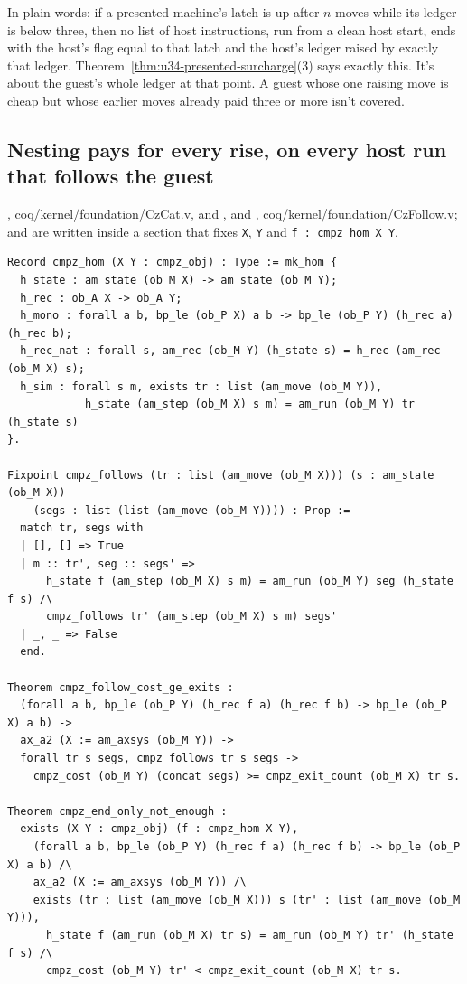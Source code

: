 In plain words: if a presented machine's latch is up after $n$ moves while its ledger is below
three, then no list of host instructions, run from a clean host start, ends with the host's flag
equal to that latch and the host's ledger raised by exactly that ledger.
Theorem~\ref{thm:u34-presented-surcharge}(3) says exactly this. It's about the guest's whole
ledger at that point. A guest whose one raising move is cheap but whose earlier moves already
paid three or more isn't covered.

\subsection{Nesting pays for every rise, on every host run that follows the guest}

{\raggedright {}, coq/kernel/foundation/CzCat.v, and ,
 and ,
coq/kernel/foundation/CzFollow.v;  and 
are written inside a section that fixes \texttt{X}, \texttt{Y} and \texttt{f : cmpz\_hom X Y}.\par}

{\scriptsize
\begin{verbatim}
Record cmpz_hom (X Y : cmpz_obj) : Type := mk_hom {
  h_state : am_state (ob_M X) -> am_state (ob_M Y);
  h_rec : ob_A X -> ob_A Y;
  h_mono : forall a b, bp_le (ob_P X) a b -> bp_le (ob_P Y) (h_rec a) (h_rec b);
  h_rec_nat : forall s, am_rec (ob_M Y) (h_state s) = h_rec (am_rec (ob_M X) s);
  h_sim : forall s m, exists tr : list (am_move (ob_M Y)),
            h_state (am_step (ob_M X) s m) = am_run (ob_M Y) tr (h_state s)
}.

Fixpoint cmpz_follows (tr : list (am_move (ob_M X))) (s : am_state (ob_M X))
    (segs : list (list (am_move (ob_M Y)))) : Prop :=
  match tr, segs with
  | [], [] => True
  | m :: tr', seg :: segs' =>
      h_state f (am_step (ob_M X) s m) = am_run (ob_M Y) seg (h_state f s) /\
      cmpz_follows tr' (am_step (ob_M X) s m) segs'
  | _, _ => False
  end.

Theorem cmpz_follow_cost_ge_exits :
  (forall a b, bp_le (ob_P Y) (h_rec f a) (h_rec f b) -> bp_le (ob_P X) a b) ->
  ax_a2 (X := am_axsys (ob_M Y)) ->
  forall tr s segs, cmpz_follows tr s segs ->
    cmpz_cost (ob_M Y) (concat segs) >= cmpz_exit_count (ob_M X) tr s.

Theorem cmpz_end_only_not_enough :
  exists (X Y : cmpz_obj) (f : cmpz_hom X Y),
    (forall a b, bp_le (ob_P Y) (h_rec f a) (h_rec f b) -> bp_le (ob_P X) a b) /\
    ax_a2 (X := am_axsys (ob_M Y)) /\
    exists (tr : list (am_move (ob_M X))) s (tr' : list (am_move (ob_M Y))),
      h_state f (am_run (ob_M X) tr s) = am_run (ob_M Y) tr' (h_state f s) /\
      cmpz_cost (ob_M Y) tr' < cmpz_exit_count (ob_M X) tr s.
\end{verbatim}}

